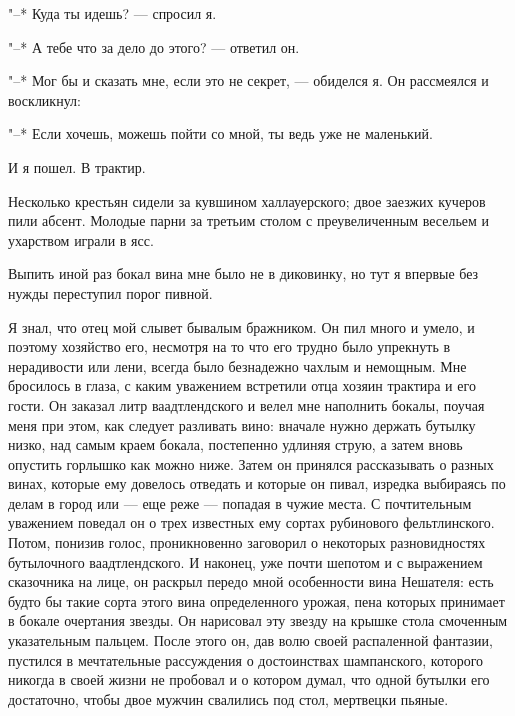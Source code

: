 "--* Куда ты идешь? --- спросил я.

"--* А тебе что за дело до этого? --- ответил он.

"--* Мог  бы и  сказать мне, если  это не секрет,  --- обиделся  я. Он
рассмеялся и воскликнул:

"--* Если хочешь, можешь пойти со мной, ты ведь уже не маленький.

И я пошел. В трактир.

Несколько  крестьян сидели  за  кувшином  халлауерского; двое  заезжих
кучеров пили абсент. Молодые парни  за третьим столом с преувеличенным
весельем и ухарством играли в ясс.

Выпить иной раз бокал  вина мне было не в диковинку,  но тут я впервые
без нужды переступил порог пивной.

Я знал, что отец мой слывет бывалым бражником. Он пил много и умело, и
поэтому хозяйство его, несмотря на то  что его трудно было упрекнуть в
нерадивости или  лени, всегда было  безнадежно чахлым и  немощным. Мне
бросилось в глаза, с каким  уважением встретили отца хозяин трактира и
его  гости.  Он заказал  литр  ваадтлендского  и велел  мне  наполнить
бокалы,  поучая меня  при этом,  как следует  разливать вино:  вначале
нужно  держать  бутылку  низко,  над самым  краем  бокала,  постепенно
удлиняя струю, а  затем вновь опустить горлышко как  можно ниже. Затем
он принялся рассказывать о разных винах, которые ему довелось отведать
и которые  он пивал, изредка  выбираясь по делам  в город или  --- еще
реже --- попадая в чужие места.  С почтительным уважением поведал он о
трех  известных ему  сортах рубинового  фельтлинского. Потом,  понизив
голос, проникновенно заговорил  о некоторых разновидностях бутылочного
ваадтлендского. И наконец, уже почти шепотом и с выражением сказочника
на  лице,  он раскрыл  передо  мной  особенности вина  Нешателя:  есть
будто бы  такие сорта  этого вина  определенного урожая,  пена которых
принимает в бокале очертания звезды. Он нарисовал эту звезду на крышке
стола  смоченным  указательным  пальцем.  После  этого  он,  дав  волю
своей  распаленной фантазии,  пустился  в  мечтательные рассуждения  о
достоинствах шампанского, которого никогда в своей жизни не пробовал и
о котором думал,  что одной бутылки его достаточно,  чтобы двое мужчин
свалились под стол, мертвецки пьяные.

